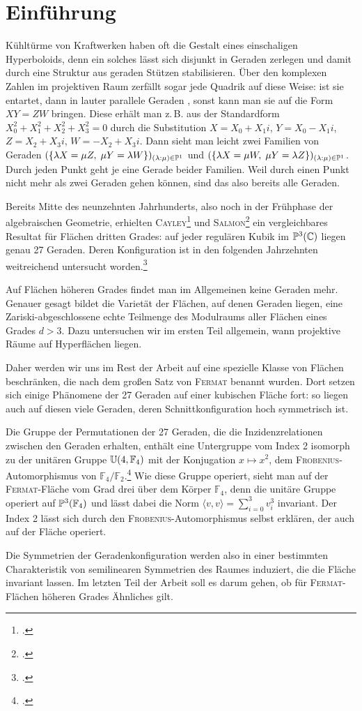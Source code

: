 \chapter{Einführung} \label{chap:intro}
Kühltürme von Kraftwerken haben oft die Gestalt eines einschaligen Hyperboloids, denn ein solches lässt sich disjunkt in Geraden zerlegen und damit durch eine Struktur aus geraden Stützen stabilisieren. Über den komplexen Zahlen im projektiven Raum zerfällt sogar jede Quadrik auf diese Weise: ist sie entartet, dann in lauter parallele Geraden       , sonst kann man sie auf die Form $XY = ZW$ bringen. Diese erhält man z.\,B. aus der Standardform $X_0^2+X_1^2+X_2^2+X_3^2=0$ durch die Substitution $X = X_0 + X_1i$, $Y = X_0 - X_1i$, $Z = X_2 + X_3i$, $W = - X_2 + X_3i$. Dann sieht man leicht zwei Familien von Geraden $(\{\lambda X = \mu Z,\; \mu Y = \lambda W\})_{(\lambda:\mu) \in \mathbb P^{1}}$ und $(\{\lambda X = \mu W,\; \mu Y = \lambda Z\})_{(\lambda:\mu) \in \mathbb P^{1}}$. Durch jeden Punkt geht je eine Gerade beider Familien. Weil durch einen Punkt nicht mehr als zwei Geraden gehen können, sind das also bereits alle Geraden.

Bereits Mitte des neunzehnten Jahrhunderts, also noch in der Frühphase der algebraischen Geometrie, erhielten \textsc{Cayley}\footcite{Cayley} und \textsc{Salmon}\footcite{Salmon} ein vergleichbares Resultat für Flächen dritten Grades: auf jeder regulären Kubik im $\mathbb P^{3}(\mathbb C)$ liegen genau 27 Geraden. Deren Konfiguration ist in den folgenden Jahrzehnten weitreichend untersucht worden.\footcite[siehe etwa][]{Henderson}

Auf Flächen höheren Grades findet man im Allgemeinen keine Geraden mehr. Genauer gesagt bildet die Varietät der Flächen, auf denen Geraden liegen, eine Zariski-abgeschlossene echte Teilmenge des Modulraums aller Flächen eines Grades $d > 3$. Dazu untersuchen wir im ersten Teil allgemein, wann projektive Räume auf Hyperflächen liegen.

Daher werden wir uns im Rest der Arbeit auf eine spezielle Klasse von Flächen beschränken, die nach dem großen Satz von \textsc{Fermat} benannt wurden. Dort setzen sich einige Phänomene der 27 Geraden auf einer kubischen Fläche fort: so liegen auch auf diesen viele Geraden, deren Schnittkonfiguration hoch symmetrisch ist.

Die Gruppe der Permutationen der 27 Geraden, die die Inzidenzrelationen zwischen den Geraden erhalten, enthält eine Untergruppe vom Index 2 isomorph zu der unitären Gruppe $\mathbb U(4,\mathbb F_4)$ mit der Konjugation $x \mapsto x^2$, dem \textsc{Frobenius}-Automorphismus von $\mathbb F_4/\mathbb F_2$.\footcite[Aufg.~C--D, S.~180]{Mumford} Wie diese Gruppe operiert, sieht man auf der \textsc{Fermat}-Fläche vom Grad drei über dem Körper $\mathbb F_4$, denn die unitäre Gruppe operiert auf $\mathbb P^{3}(\mathbb F_4)$ und lässt dabei die Norm $\langle v, v \rangle = \sum_{i=0}^3 v_i^3$ invariant. Der Index 2 lässt sich durch den \textsc{Frobenius}-Automorphismus selbst erklären, der auch auf der Fläche operiert.

Die Symmetrien der Geradenkonfiguration werden also in einer bestimmten Charakteristik von semilinearen Symmetrien des Raumes induziert, die die Fläche invariant lassen. Im letzten Teil der Arbeit soll es darum gehen, ob für \textsc{Fermat}-Flächen höheren Grades Ähnliches gilt.
